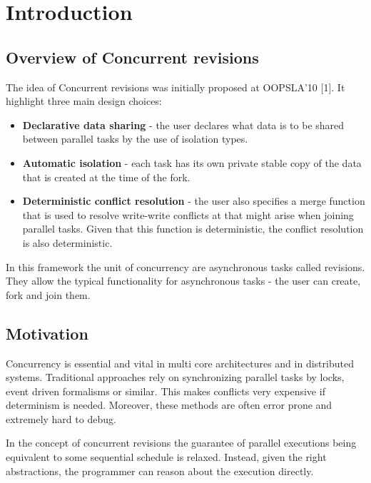 \documentclass[12pt,twoside,notitlepage]{report}
\begin{document}
\chapter{Introduction}

\section{Overview of Concurrent revisions}

The idea of Concurrent revisions was initially proposed at OOPSLA'10 [1]. It highlight three main design choices:
\begin{itemize}
\item {\bfseries Declarative data sharing} - the user declares what data is to be shared between parallel tasks by the use of isolation types.

\item {\bfseries Automatic isolation} - each task has its own private stable copy of the data that is created at the time of the fork.

\item {\bfseries Deterministic conflict resolution} - the user also specifies a merge function that is used to resolve write-write conflicts at that might arise when joining parallel tasks. Given that this function is deterministic, the conflict resolution is also deterministic.

\end{itemize}

In this framework the unit of concurrency are asynchronous tasks called revisions. They allow the typical functionality for asynchronous tasks - the user can create, fork and join them. 

\section{Motivation}
 
Concurrency is essential and vital in multi core architectures and in distributed systems. Traditional approaches rely on synchronizing parallel tasks by locks, event driven formalisms or similar. This makes conflicts very expensive if determinism is needed. Moreover, these methods are often error prone and extremely hard to debug.

In the concept of concurrent revisions the guarantee of parallel executions being equivalent to some sequential schedule is relaxed. Instead, given the right abstractions, the programmer can reason about the execution directly. 
\end{document}
